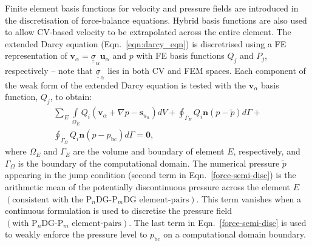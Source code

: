 \documentclass[preprint,authoryear,12pt]{elsarticle}
\newcommand{\PN}[2][error]{P$_{#1}$DG-P$_{#2}$}
\newcommand{\PNDG}[2][error]{P$_{#1}$DG-P$_{#2}$DG}
\begin{document}
Finite element basis functions for velocity and pressure fields are introduced in the discretisation of force-balance equations. Hybrid basis functions are also used to allow CV-based velocity to be extrapolated across the entire element. The extended Darcy equation (Eqn.~\ref{eqn:darcy_eqn}) is discretrised using a FE representation of $\mathbf{v}_{\alpha}=\underline{\underline{\sigma}}_{\alpha}\mathbf{u}_{\alpha}$ and $p$ with FE basis functions $Q_{j}$ and $P_{j}$, respectively -- note that $\underline{\underline{\sigma}}_{\alpha}$ lies in both CV and FEM spaces. Each component of the weak form of the extended Darcy equation is tested with the $\mathbf{v}_\alpha$ basis function, $Q_{j}$, to obtain:
\begin{eqnarray}
  \sum\limits_{E} \left. \int\limits_{\Omega_E} { {Q}}_{i} \left({\mathbf v}_\alpha + \nabla p  -{\mathbf s}_{u_\alpha} \right) dV \right. + \displaystyle \oint_{\Gamma_{E}} {Q}_i {\mathbf n} \left(p - \tilde{p}\right) d\Gamma + \nonumber \\ 
  \oint_{\Gamma_{\Omega}} {Q}_i {\mathbf n} \left(p - p_\text{bc}\right) d\Gamma = \bm{0},
                   \label{force-semi-disc} 
\end{eqnarray} 
where $\Omega_E$ and $\Gamma_{E}$ are the volume and boundary of element $E$, respectively, and $\Gamma_{\Omega}$ is the boundary of the computational domain. The numerical pressure $\tilde{p}$ appearing in the jump condition (second term in Eqn.~\ref{force-semi-disc}) is the arithmetic mean of the potentially discontinuous pressure across the element $E$ $\left(\text{consistent with the \PNDG[n]{m} element-pairs}\right)$. This term vanishes when a continuous formulation is used to discretise the pressure field $\left(\text{with \PN[n]{m} element-pairs}\right)$. The last term in Eqn.~\ref{force-semi-disc} is used to weakly enforce the pressure level to $p_\text{bc}$ on a computational domain boundary.
\end{document}
